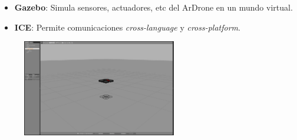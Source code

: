 \documentclass[notes,slidesec,a4]{seminar}
\begin{document}

\begin{hslide}
\begin{itemize}
\item \textbf{Gazebo}: Simula sensores, actuadores, etc del ArDrone en un mundo virtual.
\item \textbf{ICE}: Permite comunicaciones \textit{cross-language} y \textit{cross-platform}.
\end{itemize}

\begin{center}
\begin{figure}
\includegraphics[width=0.6\textwidth]{img/gazebo}
\end{figure}
\end{center}
\end{hslide}


\end{document}
